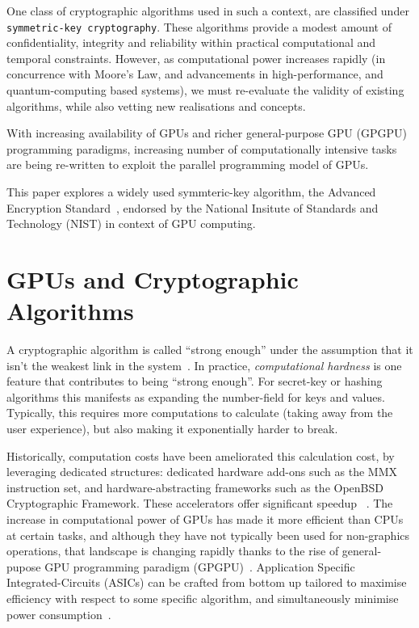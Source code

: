 \documentclass[letterpaper,twocolumn,10pt]{article}
\begin{document}
One class of cryptographic algorithms used in such a context, are classified under \texttt{symmetric-key cryptography}.
These algorithms provide a modest amount of confidentiality, integrity and reliability within practical computational and temporal constraints.
However, as computational power increases rapidly (in concurrence with Moore's Law, and advancements in high-performance, and quantum-computing based systems), we must re-evaluate the validity of existing algorithms, while also vetting new realisations and concepts.

With increasing availability of GPUs and richer general-purpose GPU (GPGPU) programming paradigms, increasing number of computationally intensive tasks are being re-written to exploit the parallel programming model of GPUs. 

This paper explores a widely used symmteric-key algorithm, the Advanced Encryption Standard~\cite{AES}, endorsed by the National Insitute of Standards and Technology (NIST) in context of GPU computing.  

\section{GPUs and Cryptographic Algorithms}
A cryptographic algorithm is called ``strong enough'' under the assumption that it isn't the weakest link in the system~\cite{strongEnough}.
In practice, \textit{computational hardness} is one feature that contributes to being ``strong enough''.
For secret-key or hashing algorithms this manifests as expanding the number-field for keys and values.
Typically, this requires more computations to calculate (taking away from the user experience), but also making it exponentially harder to break.

Historically, computation costs have been ameliorated this calculation cost, by leveraging dedicated structures: dedicated hardware add-ons such as the MMX instruction set, and hardware-abstracting frameworks such as the OpenBSD Cryptographic Framework. These accelerators offer significant speedup ~\cite{ocf_design}.
The increase in computational power of GPUs has made it more efficient than CPUs at certain tasks, and although they have not typically been used for non-graphics operations, that landscape is changing rapidly thanks to the rise of general-pupose GPU programming paradigm (GPGPU)~\cite{cryptographics}.
Application Specific Integrated-Circuits (ASICs) can be crafted from bottom up tailored to maximise efficiency with respect to some specific algorithm, and simultaneously minimise power consumption~\cite{bhatnagar}.
\end{document}
